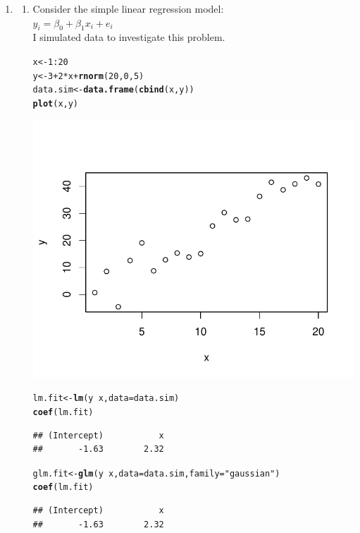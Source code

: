 \documentclass[12pt]{article}\usepackage[]{graphicx}\usepackage[]{color}
\makeatletter
\newcommand{\hlnum}[1]{\textcolor[rgb]{0.686,0.059,0.569}{#1}}%
\newcommand{\hlstr}[1]{\textcolor[rgb]{0.192,0.494,0.8}{#1}}%
\newcommand{\hlopt}[1]{\textcolor[rgb]{0,0,0}{#1}}%
\newcommand{\hlstd}[1]{\textcolor[rgb]{0.345,0.345,0.345}{#1}}%
\newcommand{\hlkwb}[1]{\textcolor[rgb]{0.69,0.353,0.396}{#1}}%
\newcommand{\hlkwc}[1]{\textcolor[rgb]{0.333,0.667,0.333}{#1}}%
\newcommand{\hlkwd}[1]{\textcolor[rgb]{0.737,0.353,0.396}{\textbf{#1}}}%
\newenvironment{kframe}{%
 \def\at@end@of@kframe{}%
 \ifinner\ifhmode%
  \def\at@end@of@kframe{\end{minipage}}%
  \begin{minipage}{\columnwidth}%
 \fi\fi%
 \def\FrameCommand##1{\hskip\@totalleftmargin \hskip-\fboxsep
 \colorbox{shadecolor}{##1}\hskip-\fboxsep
     \hskip-\linewidth \hskip-\@totalleftmargin \hskip\columnwidth}%
 \MakeFramed {\advance\hsize-\width
   \@totalleftmargin\z@ \linewidth\hsize
   \@setminipage}}%
 {\par\unskip\endMakeFramed%
 \at@end@of@kframe}
\newenvironment{knitrout}{}{} %
\makeatother
\begin{document}
\begin{doublespacing}
\begin{enumerate}
\begin{enumerate}
\begin{knitrout}
\end{knitrout}


\end{enumerate}

\item \begin{enumerate}

\item Consider the simple linear regression model: \\

$y_i = \beta_0 + \beta_1x_i + e_i$ \\

I simulated data to investigate this problem.

\begin{knitrout}\footnotesize
{}\color{fgcolor}\begin{kframe}
\begin{alltt}
\hlstd{x} \hlkwb{<-} \hlnum{1}\hlopt{:}\hlnum{20}
\hlstd{y} \hlkwb{<-} \hlnum{3} \hlopt{+} \hlnum{2}\hlopt{*}\hlstd{x} \hlopt{+} \hlkwd{rnorm}\hlstd{(}\hlnum{20}\hlstd{,}\hlnum{0}\hlstd{,}\hlnum{5}\hlstd{)}
\hlstd{data.sim} \hlkwb{<-} \hlkwd{data.frame}\hlstd{(}\hlkwd{cbind}\hlstd{(x,y))}
\hlkwd{plot}\hlstd{(x,y)}
\end{alltt}
\end{kframe}
\includegraphics[width=.5\linewidth]{figure/sim2-1} 
\begin{kframe}\begin{alltt}
\hlstd{lm.fit} \hlkwb{<-} \hlkwd{lm}\hlstd{(y} \hlopt{~} \hlstd{x,} \hlkwc{data} \hlstd{= data.sim)}
\hlkwd{coef}\hlstd{(lm.fit)}
\end{alltt}
\begin{verbatim}
## (Intercept)           x 
##       -1.63        2.32
\end{verbatim}
\begin{alltt}
\hlstd{glm.fit} \hlkwb{<-} \hlkwd{glm}\hlstd{(y} \hlopt{~} \hlstd{x,} \hlkwc{data} \hlstd{= data.sim,} \hlkwc{family} \hlstd{=} \hlstr{"gaussian"}\hlstd{)}
\hlkwd{coef}\hlstd{(lm.fit)}
\end{alltt}
\begin{verbatim}
## (Intercept)           x 
##       -1.63        2.32
\end{verbatim}
\end{kframe}
\end{knitrout}



\end{enumerate}
\end{enumerate}
\end{doublespacing}
\end{document}
